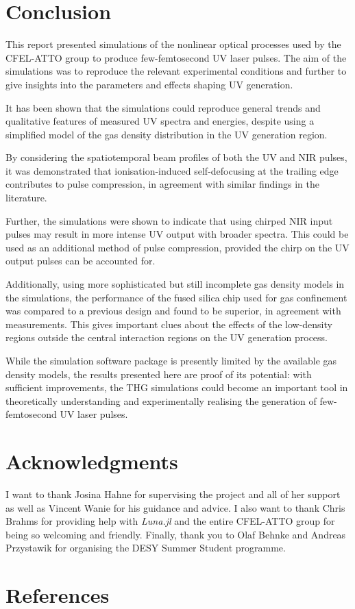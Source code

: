 \documentclass[a4paper]{jpconf}
\begin{document}
\section{Conclusion}
This report presented simulations of the nonlinear optical processes used by the CFEL-ATTO group to produce few-femtosecond UV laser pulses. The aim of the simulations was to reproduce the relevant experimental conditions and further to give insights into the parameters and effects shaping UV generation. \par 
It has been shown that the simulations could reproduce general trends and qualitative features of measured UV spectra and energies, despite using a simplified model of the gas density distribution in the UV generation region.\par 
By considering the spatiotemporal beam profiles of both the UV and NIR pulses, it was demonstrated that ionisation-induced self-defocusing at the trailing edge contributes to pulse compression, in agreement with similar findings in the literature. \par 
Further, the simulations were shown to indicate that using chirped NIR input pulses may result in more intense UV output with broader spectra. This could be used as an additional method of pulse compression, provided the chirp on the UV output pulses can be accounted for. \par  
Additionally, using more sophisticated but still incomplete gas density models in the simulations, the performance of the fused silica chip used for gas confinement was compared to a previous design and found to be superior, in agreement with measurements. This gives important clues about the effects of the low-density regions outside the central interaction regions on the UV generation process. \par 
While the simulation software package is presently limited by the available gas density models, the results presented here are proof of its potential: with sufficient improvements, the THG simulations could become an important tool in theoretically understanding and experimentally realising the generation of few-femtosecond UV laser pulses. 

\section*{Acknowledgments}
I want to thank Josina Hahne for supervising the project and all of her support as well as Vincent Wanie for his guidance and advice. I also want to thank Chris Brahms for providing help with \textit{Luna.jl} and the entire CFEL-ATTO group for being so welcoming and friendly. Finally, thank you to Olaf Behnke and Andreas Przystawik for organising the DESY Summer Student programme. 

\section*{References}


\end{document}
